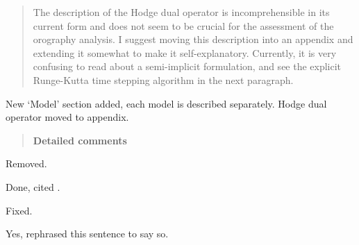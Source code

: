 \documentclass{article}
\begin{document}
\begin{quotation}
\begin{enumerate}
The description of the Hodge dual operator is incomprehensible in its current form and does not seem to be crucial for the assessment of the orography analysis.  I suggest moving this description into an appendix and extending it somewhat to make it self-explanatory.  Currently, it is very confusing to read about a semi-implicit formulation, and see the explicit Runge-Kutta time stepping algorithm in the next paragraph.
\end{enumerate}
\end{quotation}
New `Model' section added, each model is described separately.  Hodge dual operator moved to appendix.

\begin{quotation}
\noindent
\textbf{Detailed comments}

\begin{comment}
\item Line 21: The Scorer parameter and Froude number are mentioned in the abstract, but never again in the manuscript.  Either remove this sentence from the abstract, or add the missing discussion why larger Scorer parameters and Froude numbers are a challenge for the cut cell method.  This is not obvious.
\end{comment}
\end{quotation}
Removed.

\begin{quotation}
\begin{comment}
\item Line 33: another way of treating orography are `immersed boundary methods' or `embedded boundary methods'.  Please add this information including a reference.
\end{comment}
\end{quotation}
Done, cited \citet{simon2012}.

\begin{quotation}
\begin{comment}
\item Line 33, typo: `\ldots approaches to respresenting \ldots'
\end{comment}
\end{quotation}
Fixed.

\begin{quotation}
\begin{comment}
\item Line 53/54: do you mean interpolations to z-levels in order to compute the pressure gradient?
\end{comment}
\end{quotation}
Yes, rephrased this sentence to say so.
\end{document}
